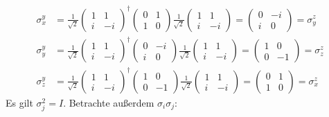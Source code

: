 \documentclass[a4paper,12pt]{article}
\begin{document}
\begin{align*}
\sigma_x^y&=\frac{1}{\sqrt{2}}\begin{pmatrix}
1 & 1 \\ i & -i
\end{pmatrix}^\dagger \begin{pmatrix}
0 & 1 \\ 1 & 0
\end{pmatrix}\frac{1}{\sqrt{2}}\begin{pmatrix}
1 & 1 \\ i & -i
\end{pmatrix}= \begin{pmatrix}
0 & -i \\ i & 0
\end{pmatrix}=\sigma_y^z\\
\sigma_y^y&=\frac{1}{\sqrt{2}}\begin{pmatrix}
1 & 1 \\ i & -i
\end{pmatrix}^\dagger \begin{pmatrix}
0 & -i \\ i & 0
\end{pmatrix}\frac{1}{\sqrt{2}}\begin{pmatrix}
1 & 1 \\ i & -i
\end{pmatrix}= \begin{pmatrix}
1 & 0 \\ 0 & -1
\end{pmatrix}=\sigma_z^z\\
\sigma_z^y&=\frac{1}{\sqrt{2}}\begin{pmatrix}
1 & 1 \\ i & -i
\end{pmatrix}^\dagger \begin{pmatrix}
1 & 0 \\ 0 & -1
\end{pmatrix}\frac{1}{\sqrt{2}}\begin{pmatrix}
1 & 1 \\ i & -i
\end{pmatrix}= \begin{pmatrix}
0 & 1 \\ 1 & 0
\end{pmatrix}=\sigma_x^z
\end{align*}
Es gilt $\sigma_j^2=I$. Betrachte außerdem $\sigma_i\sigma_j$:
\end{document}
